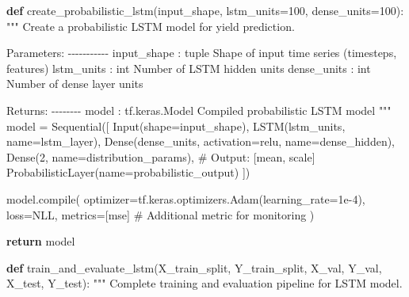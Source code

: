 \documentclass[
  letterpaper,
  DIV=11,
  numbers=noendperiod]{scrreprt}
\newenvironment{Shaded}{\begin{snugshade}}{\end{snugshade}}
\newcommand{\BuiltInTok}[1]{\textcolor[rgb]{0.00,0.23,0.31}{#1}}
\newcommand{\CommentTok}[1]{\textcolor[rgb]{0.37,0.37,0.37}{#1}}
\newcommand{\ControlFlowTok}[1]{\textcolor[rgb]{0.00,0.23,0.31}{\textbf{#1}}}
\newcommand{\DecValTok}[1]{\textcolor[rgb]{0.68,0.00,0.00}{#1}}
\newcommand{\FloatTok}[1]{\textcolor[rgb]{0.68,0.00,0.00}{#1}}
\newcommand{\KeywordTok}[1]{\textcolor[rgb]{0.00,0.23,0.31}{\textbf{#1}}}
\newcommand{\NormalTok}[1]{\textcolor[rgb]{0.00,0.23,0.31}{#1}}
\newcommand{\OperatorTok}[1]{\textcolor[rgb]{0.37,0.37,0.37}{#1}}
\newcommand{\StringTok}[1]{\textcolor[rgb]{0.13,0.47,0.30}{#1}}
\begin{document}
\begin{Shaded}
\begin{Highlighting}[]
\KeywordTok{def}\NormalTok{ create\_probabilistic\_lstm(input\_shape, lstm\_units}\OperatorTok{=}\DecValTok{100}\NormalTok{, dense\_units}\OperatorTok{=}\DecValTok{100}\NormalTok{):}
    \CommentTok{"""}
\CommentTok{    Create a probabilistic LSTM model for yield prediction.}

\CommentTok{    Parameters:}
\CommentTok{    {-}{-}{-}{-}{-}{-}{-}{-}{-}{-}{-}}
\CommentTok{    input\_shape : tuple}
\CommentTok{        Shape of input time series (timesteps, features)}
\CommentTok{    lstm\_units : int}
\CommentTok{        Number of LSTM hidden units}
\CommentTok{    dense\_units : int}
\CommentTok{        Number of dense layer units}

\CommentTok{    Returns:}
\CommentTok{    {-}{-}{-}{-}{-}{-}{-}{-}}
\CommentTok{    model : tf.keras.Model}
\CommentTok{        Compiled probabilistic LSTM model}
\CommentTok{    """}
\NormalTok{    model }\OperatorTok{=}\NormalTok{ Sequential([}
\NormalTok{        Input(shape}\OperatorTok{=}\NormalTok{input\_shape),}
\NormalTok{        LSTM(lstm\_units, name}\OperatorTok{=}\StringTok{\textquotesingle{}lstm\_layer\textquotesingle{}}\NormalTok{),}
\NormalTok{        Dense(dense\_units, activation}\OperatorTok{=}\StringTok{\textquotesingle{}relu\textquotesingle{}}\NormalTok{, name}\OperatorTok{=}\StringTok{\textquotesingle{}dense\_hidden\textquotesingle{}}\NormalTok{),}
\NormalTok{        Dense(}\DecValTok{2}\NormalTok{, name}\OperatorTok{=}\StringTok{\textquotesingle{}distribution\_params\textquotesingle{}}\NormalTok{),  }\CommentTok{\# Output: [mean, scale]}
\NormalTok{        ProbabilisticLayer(name}\OperatorTok{=}\StringTok{\textquotesingle{}probabilistic\_output\textquotesingle{}}\NormalTok{)}
\NormalTok{    ])}

\NormalTok{    model.}\BuiltInTok{compile}\NormalTok{(}
\NormalTok{        optimizer}\OperatorTok{=}\NormalTok{tf.keras.optimizers.Adam(learning\_rate}\OperatorTok{=}\FloatTok{1e{-}4}\NormalTok{),}
\NormalTok{        loss}\OperatorTok{=}\NormalTok{NLL,}
\NormalTok{        metrics}\OperatorTok{=}\NormalTok{[}\StringTok{\textquotesingle{}mse\textquotesingle{}}\NormalTok{]  }\CommentTok{\# Additional metric for monitoring}
\NormalTok{    )}

    \ControlFlowTok{return}\NormalTok{ model}

\KeywordTok{def}\NormalTok{ train\_and\_evaluate\_lstm(X\_train\_split, Y\_train\_split, X\_val, Y\_val, X\_test, Y\_test):}
    \CommentTok{"""}
\CommentTok{    Complete training and evaluation pipeline for LSTM model.}


\end{Highlighting}
\end{Shaded}
\end{document}
